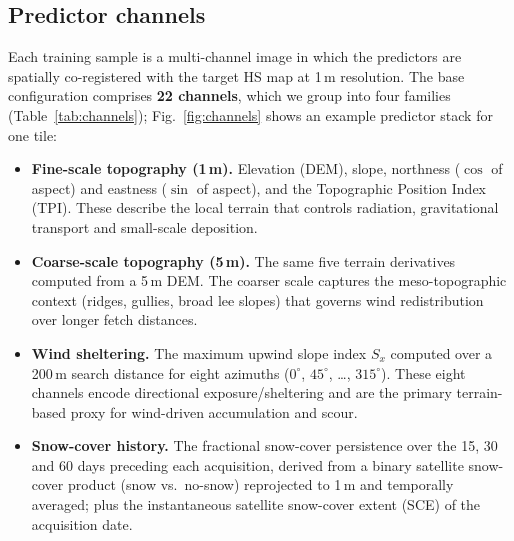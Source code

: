 \subsection{Predictor channels}
\label{subsec:channels}

Each training sample is a multi-channel image in which the predictors are
spatially co-registered with the target HS map at 1\,m resolution. The base
configuration comprises \textbf{22 channels}, which we group into four
families (Table~\ref{tab:channels}); Fig.~\ref{fig:channels} shows an example
predictor stack for one tile:

\begin{itemize}
  \item \textbf{Fine-scale topography (1\,m).} Elevation (DEM), slope,
  northness ($\cos$ of aspect) and eastness ($\sin$ of aspect), and the
  Topographic Position Index (TPI). These describe the local terrain that
  controls radiation, gravitational transport and small-scale deposition.

  \item \textbf{Coarse-scale topography (5\,m).} The same five terrain
  derivatives computed from a 5\,m DEM. The coarser scale captures the
  meso-topographic context (ridges, gullies, broad lee slopes) that governs
  wind redistribution over longer fetch distances.

  \item \textbf{Wind sheltering.} The maximum upwind slope index $S_x$
  \citep{winstral2002} computed over a 200\,m search distance for eight
  azimuths ($0^\circ$, $45^\circ$, \ldots, $315^\circ$). These eight channels
  encode directional exposure/sheltering and are the primary terrain-based
  proxy for wind-driven accumulation and scour.

  \item \textbf{Snow-cover history.} The fractional snow-cover persistence over
  the 15, 30 and 60 days preceding each acquisition, derived from a binary
  satellite snow-cover product (snow vs.\ no-snow) reprojected to 1\,m and
  temporally averaged; plus the instantaneous satellite snow-cover extent
  (SCE) of the acquisition date.
\end{itemize}

